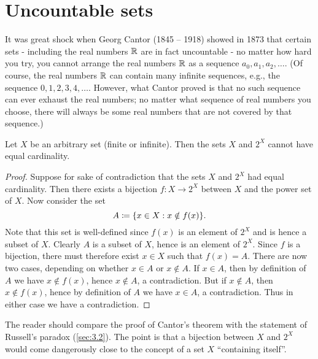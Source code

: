 \section{Uncountable sets}\label{sec:8.3}

\begin{note}
  It was great shock when Georg Cantor (1845 -- 1918) showed in 1873 that certain sets
  - including the real numbers \(\mathbb{R}\) are in fact uncountable -
  no matter how hard you try, you cannot arrange the real numbers \(\mathbb{R}\) as a sequence \(a_0, a_1, a_2, \dots\).
  (Of course, the real numbers \(\mathbb{R}\) can contain many infinite sequences, e.g., the sequence \(0, 1, 2, 3, 4, \dots\).
  However, what Cantor proved is that no such sequence can ever exhaust the real numbers;
  no matter what sequence of real numbers you choose, there will always be some real numbers that are not covered by that sequence.)
\end{note}

\begin{thm}\label{8.3.1}
  Let \(X\) be an arbitrary set (finite or infinite).
  Then the sets \(X\) and \(2^X\) cannot have equal cardinality.
\end{thm}

\begin{proof}
  Suppose for sake of contradiction that the sets \(X\) and \(2^X\) had equal cardinality.
  Then there exists a bijection \(f : X \to 2^X\) between \(X\) and the power set of \(X\).
  Now consider the set
  \[
    A \coloneqq \set{x \in X : x \notin f(x)}.
  \]
  Note that this set is well-defined since \(f(x)\) is an element of \(2^X\) and is hence a subset of \(X\).
  Clearly \(A\) is a subset of \(X\), hence is an element of \(2^X\).
  Since \(f\) is a bijection, there must therefore exist \(x \in X\) such that \(f(x) = A\).
  There are now two cases, depending on whether \(x \in A\) or \(x \notin A\).
  If \(x \in A\), then by definition of \(A\) we have \(x \notin f(x)\), hence \(x \notin A\), a contradiction.
  But if \(x \notin A\), then \(x \notin f(x)\), hence by definition of \(A\) we have \(x \in A\), a contradiction.
  Thus in either case we have a contradiction.
\end{proof}

\begin{rmk}\label{8.3.2}
  The reader should compare the proof of Cantor's theorem with the statement of Russell's paradox (\cref{sec:3.2}).
  The point is that a bijection between \(X\) and \(2^X\) would come dangerously close to the concept of a set \(X\) ``containing itself''.
\end{rmk}

